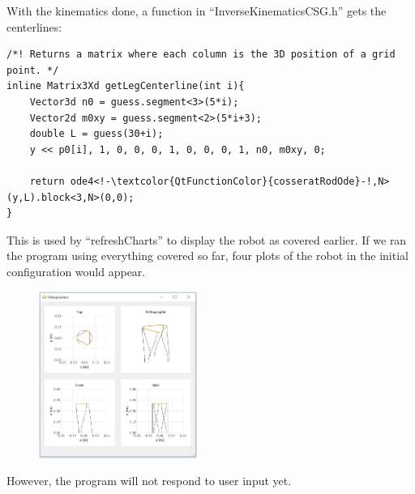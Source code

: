 \documentclass[12pt]{article}
\begin{document}
With the kinematics done, a function in ``InverseKinematicsCSG.h'' gets the centerlines:
\begin{lstlisting}
/*! Returns a matrix where each column is the 3D position of a grid point. */
inline Matrix3Xd getLegCenterline(int i){
    Vector3d n0 = guess.segment<3>(5*i);
    Vector2d m0xy = guess.segment<2>(5*i+3);
    double L = guess(30+i);
    y << p0[i], 1, 0, 0, 0, 1, 0, 0, 0, 1, n0, m0xy, 0;

    return ode4<!-\textcolor{QtFunctionColor}{cosseratRodOde}-!,N>(y,L).block<3,N>(0,0);
}
\end{lstlisting}
This is used by ``refreshCharts'' to display the robot as covered earlier. If we ran the program using everything covered so far, four plots of the robot in the initial configuration would appear.
\begin{figure}[h]
	\centering
		\includegraphics[width=0.46\textwidth]{fig/Home.jpg}
\end{figure}

\noindent
However, the program will not respond to user input yet.
\end{document}
